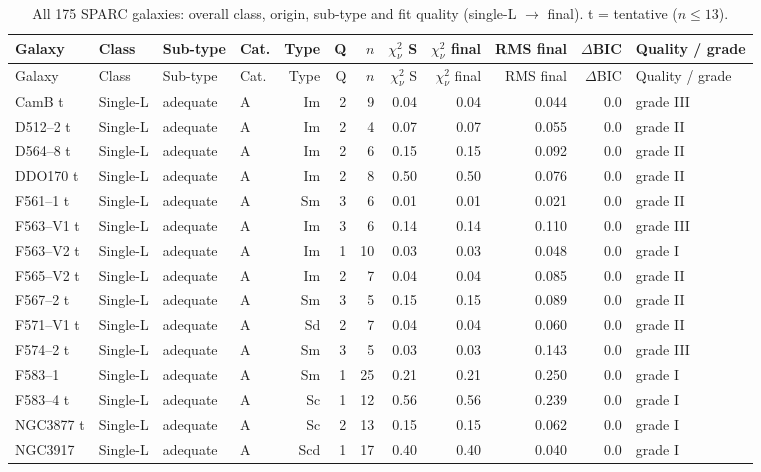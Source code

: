 \documentclass[10pt]{article}
\begin{document}
\clearpage\begin{landscape}{\scriptsize\setlength{\tabcolsep}{3pt}
\begin{longtable}{llllrrrrrrrl}
\caption{All 175 SPARC galaxies: overall class, origin, sub-type and fit quality (single-L $\to$ final). t = tentative ($n\le13$).}\\\toprule
Galaxy & Class & Sub-type & Cat. & Type & Q & $n$ & $\chi^2_{\nu}$ S & $\chi^2_\nu$ final & RMS final & $\Delta$BIC & Quality / grade\\\midrule\endfirsthead
\toprule Galaxy & Class & Sub-type & Cat. & Type & Q & $n$ & $\chi^2_{\nu}$ S & $\chi^2_\nu$ final & RMS final & $\Delta$BIC & Quality / grade\\\midrule\endhead\bottomrule\endfoot
CamB t & Single-L & adequate & A & Im & 2 & 9 & 0.04 & 0.04 & 0.044 & 0.0 & grade III\\
D512--2 t & Single-L & adequate & A & Im & 2 & 4 & 0.07 & 0.07 & 0.055 & 0.0 & grade II\\
D564--8 t & Single-L & adequate & A & Im & 2 & 6 & 0.15 & 0.15 & 0.092 & 0.0 & grade II\\
DDO170 t & Single-L & adequate & A & Im & 2 & 8 & 0.50 & 0.50 & 0.076 & 0.0 & grade II\\
F561--1 t & Single-L & adequate & A & Sm & 3 & 6 & 0.01 & 0.01 & 0.021 & 0.0 & grade II\\
F563--V1 t & Single-L & adequate & A & Im & 3 & 6 & 0.14 & 0.14 & 0.110 & 0.0 & grade III\\
F563--V2 t & Single-L & adequate & A & Im & 1 & 10 & 0.03 & 0.03 & 0.048 & 0.0 & grade I\\
F565--V2 t & Single-L & adequate & A & Im & 2 & 7 & 0.04 & 0.04 & 0.085 & 0.0 & grade II\\
F567--2 t & Single-L & adequate & A & Sm & 3 & 5 & 0.15 & 0.15 & 0.089 & 0.0 & grade II\\
F571--V1 t & Single-L & adequate & A & Sd & 2 & 7 & 0.04 & 0.04 & 0.060 & 0.0 & grade II\\
F574--2 t & Single-L & adequate & A & Sm & 3 & 5 & 0.03 & 0.03 & 0.143 & 0.0 & grade III\\
F583--1 & Single-L & adequate & A & Sm & 1 & 25 & 0.21 & 0.21 & 0.250 & 0.0 & grade I\\
F583--4 t & Single-L & adequate & A & Sc & 1 & 12 & 0.56 & 0.56 & 0.239 & 0.0 & grade I\\
NGC3877 t & Single-L & adequate & A & Sc & 2 & 13 & 0.15 & 0.15 & 0.062 & 0.0 & grade I\\
NGC3917 & Single-L & adequate & A & Scd & 1 & 17 & 0.40 & 0.40 & 0.040 & 0.0 & grade I\\

\end{longtable}}
\end{landscape}
\end{document}

